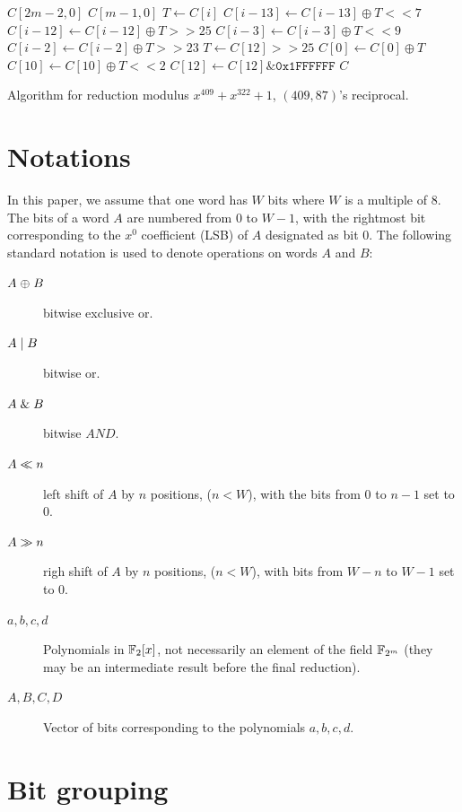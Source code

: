 \begin{algorithm}
\begin{algorithmic}[1]
  \REQUIRE $C[2m-2,0]$
  \ENSURE $C[m-1,0]$
    \STATE $T \gets C[i]$
    \STATE $C[i-13] \gets C[i-13] \oplus T << 7$
    \STATE $C[i-12] \gets C[i-12] \oplus T >> 25$
    \STATE $C[i-3] \gets C[i-3] \oplus T << 9$
    \STATE $C[i-2] \gets C[i-2] \oplus T >> 23$
  \ENDFOR
  \STATE $T \gets C[12] >> 25$
  \STATE $C[0] \gets C[0] \oplus T$
  \STATE $C[10] \gets C[10] \oplus T << 2$
  \STATE $C[12] \gets C[12] \& \texttt{0x1FFFFFF}$
  \RETURN $C$
  \caption{Algorithm for reduction modulus $x^{409} + x^{322} + 1$, $(409, 87)$'s reciprocal.}
  \label{alg:409_322}
\end{algorithmic}
\end{algorithm}

\section{Notations}

In this paper, we assume that one word has $W$ bits where $W$ is a multiple of $8$. The bits of a word $A$ are numbered from $0$ to $W-1$, with the rightmost bit corresponding to the $x^0$ coefficient (LSB) of $A$ designated as bit $0$. The following standard notation is used to denote operations on words $A$ and $B$:\\

\begin{description}
\item[$A \mathrel{\oplus} B$] bitwise exclusive or.
\item[$A \mathrel{|} B$]  bitwise or. 
\item[$A \mathrel{\&} B$]      bitwise $AND$.
\item[$A \ll n$]      left shift of $A$ by $n$ positions, ($n<W$), with the bits from 0 to $n-1$ set to $0$. 
\item[$A\gg n$]     righ shift of $A$ by $n$ positions, ($n<W$), with bits from $W-n$ to $W-1$ set to $0$. 
\item[$a, b, c, d$]  Polynomials in $\mathbb{F}_2[x]$, not necessarily an element of the field $\mathbb{F}_{2^m}$ (they may be an intermediate result before the final reduction).
\item[$A, B, C, D$]  Vector of bits corresponding to the polynomials $a, b, c, d$.
\end{description}

\section{Bit grouping}

